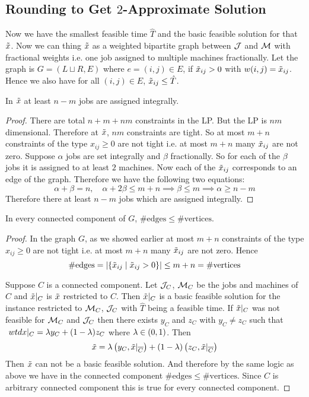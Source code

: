 \subsection{Rounding to Get \texorpdfstring{$2$}{2}-Approximate Solution}
Now we have the smallest feasible time $\hat{T}$ and the basic feasible solution for that $\tilde{x}$. Now we can thing $\tilde{x}$ as a weighted bipartite graph between $\mathcal{J}$ and $\mathcal{M}$ with fractional weights i.e. one job assigned to multiple machines fractionally. Let the graph is $G=(L\sqcup R,E)$ where $e=(i,j)\in E$, if $\tilde{x}_{ij}>0$ with $w(i,j)=\tilde{x}_{ij}$. Hence we also have for all $(i,j)\in E$, $\tilde{x}_{ij}\leq \hat{T}$. 
\begin{lemma}{}{}
	In $\tilde{x}$ at least $n-m$ jobs are assigned integrally.
\end{lemma}
\begin{proof}
	There are total $n+m+nm$ constraints in the LP. But the LP is $nm$ dimensional. Therefore at $\tilde{x}$, $nm$ constraints are tight. So at most $m+n$ constraints of the type $x_{ij}\geq 0$ are not tight i.e.  at most $m+n$ many $\tilde{x}_{ij}$ are not zero. Suppose $\alpha$ jobs are set integrally and $\beta $ fractionally. So for each of the $\beta $ jobs it is assigned to at least  $2$ machines. Now each of the $\tilde{x}_{ij}$ corresponds to an edge of the graph. Therefore we have the following two equations:$$\alpha+\beta=n,\quad \alpha+2\beta\leq m+n\implies \beta\leq m\implies \alpha\geq n-m$$Therefore there at least $n-m$ jobs which are assigned integrally.
\end{proof}
\begin{lemma}{}{}
	In every connected component of $G$, $\#\text{edges}\leq \#\text{vertices}$.
\end{lemma}
\begin{proof}
	In the graph $G$, as we showed earlier at most $m+n$ constraints of the type $x_{ij}\geq 0$ are not tight i.e.  at most $m+n$ many $\tilde{x}_{ij}$ are not zero. Hence $$\#\text{edges}=|\{\tilde{x}_{ij}\mid \tilde{x}_{ij}>0\}|\leq m+n=\#\text{vertices}$$

	Suppose $C$ is a connected component. Let $\mathcal{J}_C$, $\mathcal{M}_C$ be the jobs and machines of $C$ and $\tilde{x}|_C$ is $\tilde{x}$ restricted to $C$. Then $\tilde{x}|_C$ is a basic feasible solution for the instance restricted to $\mathcal{M}_C$, $\mathcal{J}_C$ with $\hat{T}$ being a feasible time. If $\tilde{x}|_C$ was not feasible for $\mathcal{M}_C$ and $\mathcal{J}_C$ then there exists $y_C$ and $z_C$ with $y_C\neq z_C$ such that $\  wtdx|_C=\lambda y_C+(1-\lambda)z_C$ where $\lambda\in(0,1)$. Then $$\tilde{x}=\lambda\left(y_C,\tilde{x}|_{\overline{C}}\right)+(1-\lambda)\left(z_C,\tilde{x}|_{\overline{C}}\right)$$ Then $\tilde{x}$ can not be a basic feasible solution. And therefore by the same logic as above we have in the connected component $\#\text{edges}\leq \#\text{vertices}$. Since $C$ is arbitrary connected component this is true for every connected component.
\end{proof}


